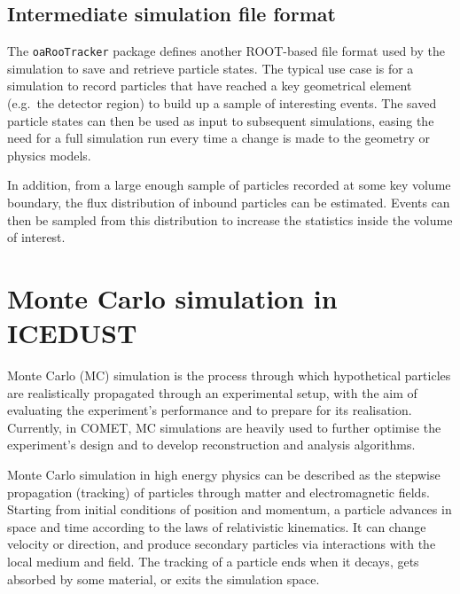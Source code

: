 \subsection{Intermediate simulation file format}
\label{subsec:RT}
The \texttt{oaRooTracker} package defines another ROOT-based file format used by
the simulation to save and retrieve particle states. The typical use case is for
a simulation to record particles that have reached a key geometrical element
(e.g.\ the detector region) to build up a sample of interesting events. The
saved particle states can then be used as input to subsequent simulations,
easing the need for a full simulation run every time a change is made to the
geometry or physics models.

In addition, from a large enough sample of particles recorded at some key volume
boundary, the flux distribution of inbound particles can be estimated. Events
can then be sampled from this distribution to increase the statistics inside the
volume of interest. 


\section{Monte Carlo simulation in ICEDUST}
\label{sec:mc_sim}
Monte Carlo (MC) simulation is the process through which hypothetical particles
are realistically propagated through an experimental setup, with the aim of
evaluating the experiment's performance and to prepare for its realisation.
Currently, in COMET, MC simulations are heavily used to further optimise the
experiment's design and to develop reconstruction and analysis algorithms.

Monte Carlo simulation in high energy physics can be described as the stepwise
propagation (tracking) of particles through matter and electromagnetic fields.
Starting from initial conditions of position and momentum, a particle advances
in space and time according to the laws of relativistic kinematics. It can
change velocity or direction, and produce secondary particles via interactions
with the local medium and field. The tracking of a particle ends when it decays,
gets absorbed by some material, or exits the simulation space.

